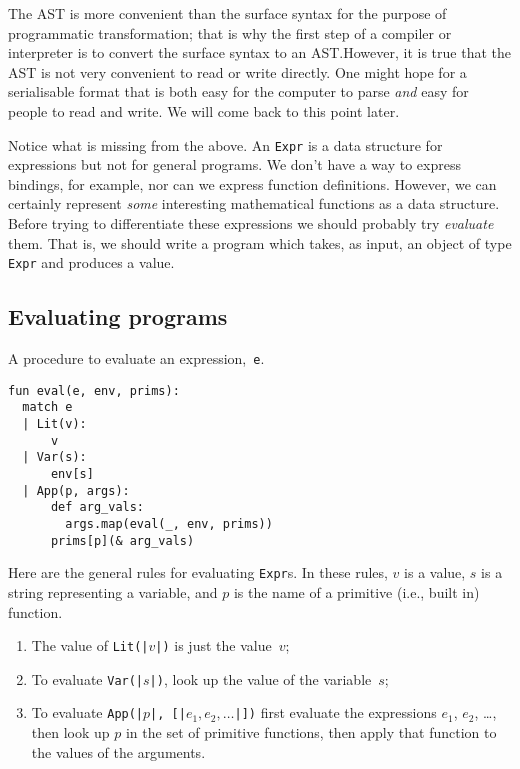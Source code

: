 \documentclass[11pt, a4paper]{article}
\newcommand{\cd}[1]{\texttt{#1}}
\begin{document}
The AST is more convenient than the surface syntax for the purpose of
programmatic transformation; that is why the first step of a compiler
or interpreter is to convert the surface syntax to an AST.\@ However,
it is true that the AST is not very convenient to read or write
directly. One might hope for a serialisable format that is both easy
for the computer to parse \emph{and} easy for people to read and
write. We will come back to this point later.

Notice what is missing from the above. An \cd{Expr} is a data
structure for expressions but not for general programs. We don't have
a way to express bindings, for example, nor can we express function
definitions. However, we can certainly represent \emph{some}
interesting mathematical functions as a data structure. Before trying
to differentiate these expressions we should probably try
\emph{evaluate} them. That is, we should write a program which takes,
as input, an object of type \cd{Expr} and produces a value.

\subsection{Evaluating programs}

\begin{marginfigure}
  \caption[Eval procedure]{A procedure to evaluate an expression,~\cd{e}.}
\footnotesize
\begin{verbatim}
fun eval(e, env, prims):
  match e
  | Lit(v):         
      v
  | Var(s):         
      env[s]
  | App(p, args):
      def arg_vals:
        args.map(eval(_, env, prims))
      prims[p](& arg_vals)
\end{verbatim}
\end{marginfigure}
Here are the general rules for evaluating \cd{Expr}s. In these rules,
$v$ is a value, $s$ is a string representing a variable, and $p$ is
the name of a primitive (i.e., built in) function.
\begin{enumerate}
\item The value of \cd{Lit(|$v$|)} is just the value~$v$;
\item To evaluate \cd{Var(|$s$|)}, look up the value of the
  variable~$s$;\label{item:eval-var}
\item To evaluate \cd{App(|$p$|, [|$e_1, e_2, \dotsc$|])} first
  evaluate the expressions $e_1$, $e_2$, \dots, then look
  up $p$ in the set of primitive functions, then apply that function to
  the values of the arguments.\label{item:eval-app}
\end{enumerate}
\end{document}
